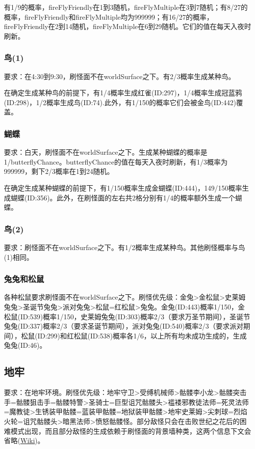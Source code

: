 有1/9的概率，fireFlyFriendly在1到3随机，fireFlyMultiple在3到7随机；有8/27的概率，fireFlyFriendly和fireFlyMultiple均为999999；有16/27的概率，fireFlyFriendly在2到14随机，fireFlyMultiple在6到29随机。它们的值在每天入夜时刷新。

\subsubsection{鸟(1)}
要求：在4:30到9:30，刷怪面不在worldSurface之下。有2/3概率生成某种鸟。

在确定生成某种鸟的前提下，有1/4概率生成红雀(ID:297)，1/4概率生成冠蓝鸦(ID:298)，1/2概率生成鸟(ID:74).此外，有1/150的概率它们会被金鸟(ID:442)覆盖。

\subsubsection{蝴蝶}
要求：白天，刷怪面不在worldSurface之下。生成某种蝴蝶的概率是1/butterflyChance。butterflyChance的值在每天入夜时刷新，有1/3概率为999999，剩下2/3概率在1到24随机。

在确定生成某种蝴蝶的前提下，有1/150概率生成金蝴蝶(ID:444)，149/150概率生成蝴蝶(ID:356)。此外，在刷怪面的左右共2格分别有1/4的概率额外生成一个蝴蝶。

\subsubsection{鸟(2)}
要求：刷怪面不在worldSurface之下。有1/2概率生成某种鸟。其他刷怪概率与鸟(1)相同。

\subsubsection{兔兔和松鼠}
各种松鼠要求刷怪面不在worldSurface之下。刷怪优先级：金兔>金松鼠>史莱姆兔兔>圣诞节兔兔>派对兔兔>松鼠=红松鼠>兔兔。金兔(ID:443)概率1/150，金松鼠(ID:539)概率1/150，史莱姆兔兔(ID:303)概率2/3（要求万圣节期间），圣诞节兔兔(ID:337)概率2/3（要求圣诞节期间），派对兔兔(ID:540)概率2/3（要求派对期间），松鼠(ID:299)和红松鼠(ID:538)概率各1/6，以上所有均未成功生成的，生成兔兔(ID:46)。

\subsection{地牢}
要求：在地牢环境。刷怪优先级：地牢守卫>受缚机械师>骷髅李小龙>骷髅突击手=骷髅狙击手=骷髅特警>圣骑士=巨型诅咒骷髅头>褴褛邪教徒法师=死灵法师=魔教徒>生锈装甲骷髅=蓝装甲骷髅=地狱装甲骷髅>地牢史莱姆>尖刺球=烈焰火轮=诅咒骷髅头>暗黑法师>愤怒骷髅怪。部分敌怪只会在击败世纪之花后的困难模式出现，而且部分敌怪的生成依赖于刷怪面的背景墙种类，这两个信息下文会省略(\href{https://terraria-zh.gamepedia.com/地牢\#.E5.9B.B0.E9.9A.BE.E6.A8.A1.E5.BC.8F.E4.B8.96.E7.BA.AA.E4.B9.8B.E8.8A.B1.E5.90.8E.E7.9A.84.E5.9C.B0.E7.89.A2}{Wiki})。

